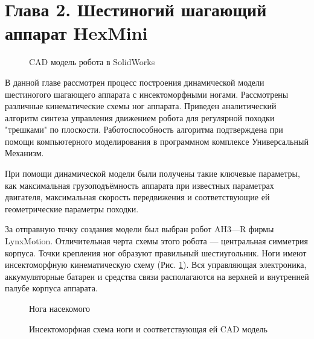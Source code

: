 \section*{Глава 2. Шестиногий шагающий аппарат HexMini}


\begin{figure}[h]
\caption{CAD модель робота в SolidWorks}
\end{figure}

В данной главе рассмотрен процесс построения динамической модели шестиногого шагающего аппарата с инсектоморфными ногами. Рассмотрены различные кинематические схемы ног аппарата. Приведен аналитический алгоритм синтеза управления движением робота для регулярной походки "трешками" по плоскости. Работоспособность алгоритма подтверждена при помощи компьютерного моделирования в программном комплексе Универсальный Механизм.

При помощи динамической модели были получены такие ключевые параметры, как максимальная грузоподъёмность аппарата при известных параметрах двигателя, максимальная скорость передвижения и соответствующие ей геометрические параметры походки.

За отправную точку создания модели был выбран робот AH3---R фирмы LynxMotion.
Отличительная черта схемы этого робота --- центральная симметрия корпуса. Точки крепления ног образуют правильный шестиугольник. Ноги имеют инсектоморфную кинематическую схему (Рис. \ref{fig:insect}). Вся управляющая электроника, аккумуляторные батареи и средства связи располагаются на верхней и внутренней палубе корпуса аппарата.

\begin{figure}[t]
\caption{Нога насекомого}
\label{fig:insect}
\end{figure}

\begin{figure}[!h]
\begin{minipage}{0.49\linewidth}
\end{minipage}
\hfill
\begin{minipage}{0.49\linewidth}
\end{minipage}
\caption{Инсектоморфная схема ноги и соответствующая ей CAD модель}
\end{figure}

